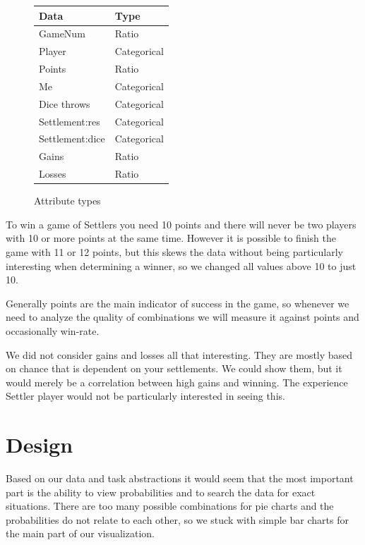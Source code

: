 \documentclass[journal]{vgtc}                %
\begin{document}
\begin{figure}
  \centering
  \begin{tabular}{|l|l|}
    \hline
    Data & Type \\ \hline
    GameNum & Ratio \\ \hline
    Player & Categorical \\ \hline
    Points & Ratio \\ \hline
    Me & Categorical \\ \hline
    Dice throws & Categorical \\ \hline
    Settlement:res & Categorical \\ \hline
    Settlement:dice & Categorical \\ \hline
    Gains & Ratio\\ \hline
    Losses & Ratio \\ \hline
  \end{tabular}
  \caption{Attribute types}
  \label{tab:types}
\end{figure}

To win a game of Settlers you need 10 points and there will never be two
players with 10 or more points at the same time. However it is possible to
finish the game with 11 or 12 points, but this skews the data without being
particularly interesting when determining a winner, so we changed all values
above 10 to just 10.

Generally points are the main indicator of success in the game, so whenever we
need to analyze the quality of combinations we will measure it against points
and occasionally win-rate.

We did not consider gains and losses all that interesting. They are mostly
based on chance that is dependent on your settlements. We could show them, but
it would merely be a correlation between high gains and winning. The
experience Settler player would not be particularly interested in seeing this.

\section{Design}

Based on our data and task abstractions it would seem that the most important
part is the ability to view probabilities and to search the data for exact
situations. There are too many possible combinations for pie charts and the
probabilities do not relate to each other, so we stuck with simple bar
charts for the main part of our visualization. 
\end{document}
